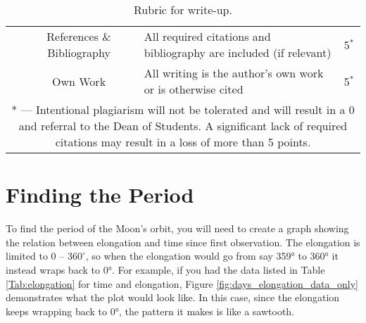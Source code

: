 \documentclass{exam}
\begin{document}
\begin{table}[!h]
\begin{tabular}{|c|c|p{6.25cm}|c|}
                   & References \& Bibliography & All required citations and bibliography are included (if relevant) & 5${}^*$\\
                   & Own Work   & All writing is the author's own work or is otherwise cited                         & 5${}^*$ \\
\hline
\multicolumn{4}{p{14cm}}{* --- Intentional plagiarism will not be tolerated and will result in a 0 and referral to the Dean of Students.  A significant lack of required citations may result in a loss of more than 5 points.}
\end{tabular}
\caption{\label{tab:rubric} Rubric for write-up.}
\end{table}
\newpage


\section{Finding the Period}
To find the period of the Moon's orbit, you will need to create a graph showing the relation between elongation and time since first observation. The elongation is limited to $0$ -- $360^\circ$, so when the elongation would go from say 359° to 360° it instead wraps back to 0°. For example, if you had the data listed in Table \ref{Tab:elongation} for time and elongation, Figure \ref{fig:days_elongation_data_only} demonstrates what the plot would look like. In this case, since the elongation keeps wrapping back to 0°, the pattern it makes is like a sawtooth.
\end{document}
